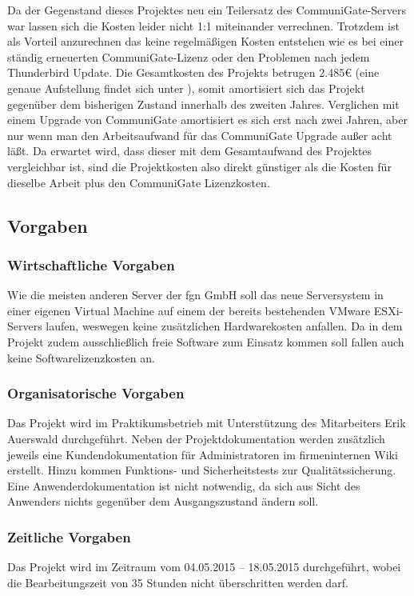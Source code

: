\documentclass[11pt,a4paper,titlepage=firstiscover,headsepline,bibtotoc]{scrartcl} %
\begin{document}
Da der Gegenstand dieses Projektes neu ein Teilersatz des CommuniGate-Servers war lassen sich die Kosten leider nicht 1:1 miteinander verrechnen. Trotzdem ist als Vorteil anzurechnen das keine regelmäßigen Kosten entstehen wie es bei einer ständig erneuerten CommuniGate-Lizenz oder den Problemen nach jedem Thunderbird Update. Die Gesamtkosten des Projekts betrugen 2.485\euro{} (eine genaue Aufstellung findet sich unter ), somit amortisiert sich das Projekt gegenüber dem bisherigen Zustand innerhalb des zweiten Jahres. Verglichen mit einem Upgrade von CommuniGate amortisiert es sich erst nach zwei Jahren, aber nur wenn man den Arbeitsaufwand für das CommuniGate Upgrade außer acht läßt. Da erwartet wird, dass dieser mit dem Gesamtaufwand des Projektes vergleichbar ist, sind die Projektkosten also direkt günstiger als die Kosten für dieselbe Arbeit plus den CommuniGate Lizenzkosten.

\subsection{Vorgaben}
\subsubsection{Wirtschaftliche Vorgaben}
Wie die meisten anderen Server der fgn GmbH soll das neue Serversystem in einer eigenen Virtual Machine auf einem der bereits bestehenden VMware ESXi-Servers laufen, weswegen keine zusätzlichen Hardwarekosten anfallen. Da in dem Projekt zudem ausschließlich freie Software zum Einsatz kommen soll fallen auch keine Softwarelizenzkosten an.

\subsubsection{Organisatorische Vorgaben}
Das Projekt wird im Praktikumsbetrieb mit Unterstützung des Mitarbeiters Erik Auerswald durchgeführt.
Neben der Projektdokumentation werden zusätzlich jeweils eine Kundendokumentation für Administratoren im firmeninternen Wiki erstellt. Hinzu kommen Funktions- und Sicherheitstests zur Qualitätssicherung. Eine Anwenderdokumentation ist nicht notwendig, da sich aus Sicht des Anwenders nichts gegenüber dem Ausgangszustand ändern soll.

\subsubsection{Zeitliche Vorgaben}
Das Projekt wird im Zeitraum vom 04.05.2015 – 18.05.2015 durchgeführt, wobei die Bearbeitungszeit von 35 Stunden nicht überschritten werden darf.
\end{document}
